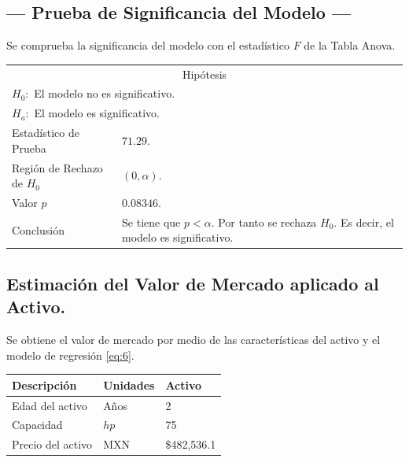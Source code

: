 \subsection{\centering --- Prueba de Significancia del Modelo ---} %
Se comprueba la significancia del modelo con el estadístico \(F\) de la Tabla Anova.
\begin{center}
  \begin{tabular}{|l|p{6cm}|}
    \cline{1-2}
    \multicolumn{2}{|c|}{Hipótesis}\\ \cline{1-2}
    \multicolumn{2}{|l|}{\(H_0:\) El modelo no es significativo.} \\ 
    \multicolumn{2}{|l|}{\(H_a:\) El modelo es significativo.} \\ \cline{1-2}
    Estadístico de Prueba & \(71.29\).\\ \cline{1-2} 
		Región de Rechazo de \(H_0\) & \((0, \alpha )\).\\ \cline{1-2} 
    Valor \(p\) & \(0.08346\).\\ \cline{1-2} 
    Conclusión & Se tiene que \(p<\alpha\). \newline 
		Por tanto se rechaza \(H_0\). \newline 
		Es decir, el modelo es significativo.\\ \cline{1-2} 
  \end{tabular}
\end{center} 

\subsection{\centering Estimación del Valor de Mercado aplicado al Activo.} %
Se obtiene el valor de mercado por medio de las características del activo y el modelo de regresión \eqref{eq:6}.
\begin{center}
  \begin{tabular}{|l|l|l|}
    \hline 
		Descripción   & Unidades  & Activo \\ \hline 
    Edad del activo    & Años      & 2      \\ \hline 
		Capacidad  & \(hp\) & 75   \\ \hline 
		Precio del activo   & MXN       & \$482,536.1   \\ \hline 
  \end{tabular}
\end{center} 


